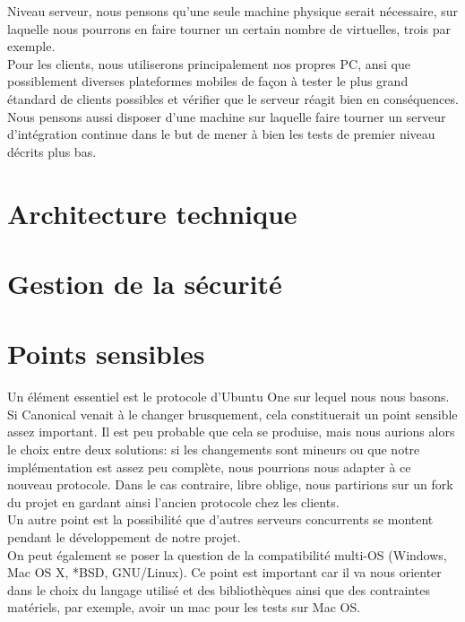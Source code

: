 \documentclass[12pt]{report}
\begin{document}
Niveau serveur, nous pensons qu'une seule machine physique serait nécessaire, sur laquelle nous pourrons en faire tourner un certain nombre de virtuelles, trois par exemple.\\

Pour les clients, nous utiliserons principalement nos propres PC, ansi que possiblement diverses plateformes mobiles de façon à tester le plus grand étandard de clients possibles et vérifier que le serveur réagit bien en conséquences.\\

Nous pensons aussi disposer d'une machine sur laquelle faire tourner un serveur d'intégration continue dans le but de mener à bien les tests de premier niveau décrits plus bas.

\section{Architecture technique}

\section{Gestion de la sécurité}
\section{Points sensibles}
Un élément essentiel est le protocole d'Ubuntu One sur lequel nous nous basons. Si Canonical venait à le changer brusquement, cela constituerait un point sensible assez important. Il est peu probable que cela se produise, mais nous aurions alors le choix entre deux solutions: si les changements sont mineurs ou que notre implémentation est assez peu complète, nous pourrions nous adapter à ce nouveau protocole. Dans le cas contraire, libre oblige, nous partirions sur un fork du projet en gardant ainsi l'ancien protocole chez les clients.\\

Un autre point est la possibilité que d'autres serveurs concurrents se montent pendant le développement de notre projet.\\

On peut également se poser la question de la compatibilité multi-OS (Windows, Mac OS X, *BSD, GNU/Linux). Ce point est important car il va nous orienter dans le choix du langage utilisé et des bibliothèques ainsi que des contraintes matériels, par exemple, avoir un mac pour les tests sur Mac OS.\\
\end{document}

